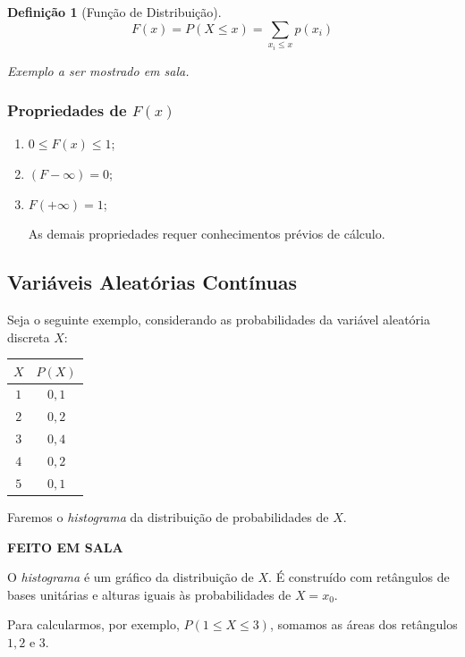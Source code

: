 \documentclass[oneside,a4paper,12pt]{article}
\newtheorem{definition}{Definição}[section]
\begin{document}
\begin{definition}[Função de Distribuição]
	$$F(x) = P(X \leq x) = \sum_{x_i \leq x}p(x_i)$$
\end{definition}

\begin{center}
	{\it Exemplo a ser mostrado em sala.}
\end{center}

\subsubsection{Propriedades de $F(x)$}
\begin{enumerate}
	\item $0 \leq F(x) \leq 1$;
	\item $(F - \infty) = 0$;
	\item $F(+\infty) = 1$;
	
	As demais propriedades requer conhecimentos prévios de cálculo.
\end{enumerate}

\subsection{Variáveis Aleatórias Contínuas}

Seja o seguinte exemplo, considerando as probabilidades da variável aleatória discreta $X$:

\begin{table}[!h]
	\centering
	\begin{tabular}{|c|c|}
		\hline
		$X$	&	$P(X)$	\\\hline
		$1$	&	$0,1$	\\\hline
		$2$	&	$0,2$	\\\hline
		$3$	&	$0,4$	\\\hline
		$4$	&	$0,2$	\\\hline
		$5$	&	$0,1$	\\\hline	
	\end{tabular}
\end{table}

Faremos o \emph{histograma} da distribuição de probabilidades de $X$.

{\bf FEITO EM SALA}

O {\it histograma} é um gráfico da distribuição de $X$. É construído com retângulos de bases unitárias e alturas iguais às probabilidades de $X = x_0$.

Para calcularmos, por exemplo, $P(1\leq X \leq 3)$, somamos as áreas dos retângulos $1,2$ e $3$.
\end{document}
